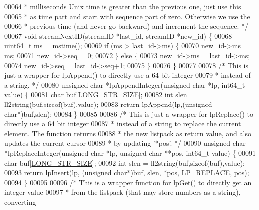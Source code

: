 \begin{DoxyCode}
00064 \textcolor{comment}{ * milliseconds Unix time is greater than the previous one, just use this}
00065 \textcolor{comment}{ * as time part and start with sequence part of zero. Otherwise we use the}
00066 \textcolor{comment}{ * previous time (and never go backward) and increment the sequence. */}
00067 \textcolor{keywordtype}{void} streamNextID(streamID *last\_id, streamID *new\_id) \{
00068     uint64\_t ms = mstime();
00069     \textcolor{keywordflow}{if} (ms > last\_id->ms) \{
00070         new\_id->ms = ms;
00071         new\_id->seq = 0;
00072     \} \textcolor{keywordflow}{else} \{
00073         new\_id->ms = last\_id->ms;
00074         new\_id->seq = last\_id->seq+1;
00075     \}
00076 \}
00077 
00078 \textcolor{comment}{/* This is just a wrapper for lpAppend() to directly use a 64 bit integer}
00079 \textcolor{comment}{ * instead of a string. */}
00080 \textcolor{keywordtype}{unsigned} \textcolor{keywordtype}{char} *lpAppendInteger(\textcolor{keywordtype}{unsigned} \textcolor{keywordtype}{char} *lp, int64\_t value) \{
00081     \textcolor{keywordtype}{char} buf[\hyperlink{server_8h_a39ec35278876f65fc1ef70b049856ca3}{LONG\_STR\_SIZE}];
00082     \textcolor{keywordtype}{int} slen = ll2string(buf,\textcolor{keyword}{sizeof}(buf),value);
00083     \textcolor{keywordflow}{return} lpAppend(lp,(\textcolor{keywordtype}{unsigned} \textcolor{keywordtype}{char}*)buf,slen);
00084 \}
00085 
00086 \textcolor{comment}{/* This is just a wrapper for lpReplace() to directly use a 64 bit integer}
00087 \textcolor{comment}{ * instead of a string to replace the current element. The function returns}
00088 \textcolor{comment}{ * the new listpack as return value, and also updates the current cursor}
00089 \textcolor{comment}{ * by updating '*pos'. */}
00090 \textcolor{keywordtype}{unsigned} \textcolor{keywordtype}{char} *lpReplaceInteger(\textcolor{keywordtype}{unsigned} \textcolor{keywordtype}{char} *lp, \textcolor{keywordtype}{unsigned} \textcolor{keywordtype}{char} **pos, int64\_t value) \{
00091     \textcolor{keywordtype}{char} buf[\hyperlink{server_8h_a39ec35278876f65fc1ef70b049856ca3}{LONG\_STR\_SIZE}];
00092     \textcolor{keywordtype}{int} slen = ll2string(buf,\textcolor{keyword}{sizeof}(buf),value);
00093     \textcolor{keywordflow}{return} lpInsert(lp, (\textcolor{keywordtype}{unsigned} \textcolor{keywordtype}{char}*)buf, slen, *pos, \hyperlink{listpack_8h_a29d3b9a55d47053582a5025dd85d7fe6}{LP\_REPLACE}, pos);
00094 \}
00095 
00096 \textcolor{comment}{/* This is a wrapper function for lpGet() to directly get an integer value}
00097 \textcolor{comment}{ * from the listpack (that may store numbers as a string), converting}

\end{DoxyCode}
